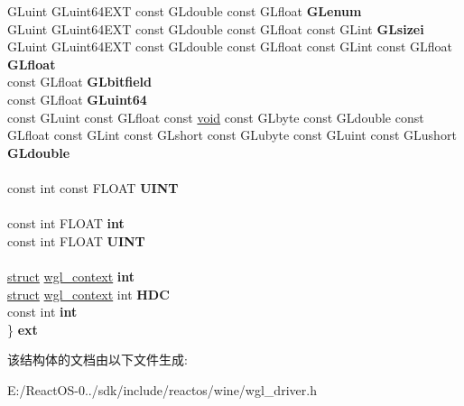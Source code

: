\begin{DoxyCompactItemize}
\begin{tabbing}
\>GLuint GLuint64EXT const GLdouble const GLfloat {\bfseries GLenum}\\
\>GLuint GLuint64EXT const GLdouble const GLfloat const GLint {\bfseries GLsizei}\\
\>GLuint GLuint64EXT const GLdouble const GLfloat const GLint const GLfloat {\bfseries GLfloat}\\
\>const GLfloat {\bfseries GLbitfield}\\
\>const GLfloat {\bfseries GLuint64}\\
\>const GLuint const GLfloat const \hyperlink{interfacevoid}{void} const GLbyte const GLdouble const GLfloat const GLint const GLshort const GLubyte const GLuint const GLushort {\bfseries GLdouble}\\
\\
\>const int const FLOAT {\bfseries UINT}\\
\\
\>const int FLOAT {\bfseries int}\\
\>const int FLOAT {\bfseries UINT}\\
\\
\>\hyperlink{interfacestruct}{struct} \hyperlink{structwgl__context}{wgl\_context} {\bfseries int}\\
\>\hyperlink{interfacestruct}{struct} \hyperlink{structwgl__context}{wgl\_context} int {\bfseries HDC}\\
\>const int {\bfseries int}\\
\} {\bfseries ext}\\

\end{tabbing}\end{DoxyCompactItemize}


该结构体的文档由以下文件生成\+:\begin{DoxyCompactItemize}
\item 
E\+:/\+React\+O\+S-\/0../sdk/include/reactos/wine/wgl\+\_\+driver.\+h\end{DoxyCompactItemize}
